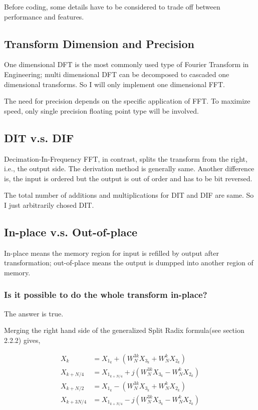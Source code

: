 \documentclass[a4paper]{report}
\begin{document}
	Before coding, some details have to be considered to trade off between performance and features.

\subsection{Transform Dimension and Precision} \indent

	One dimensional DFT is the most commonly used type of Fourier Transform in Engineering; multi dimensional DFT can be decomposed to cascaded one dimensional transforms. So I will only implement one dimensional FFT.
	
	The need for precision depends on the specific application of FFT. To maximize speed, only single precision floating point type will be involved.

\subsection{DIT v.s. DIF} \indent

	Decimation-In-Frequency FFT, in contrast, splits the transform from the right, i.e., the output side. The derivation method is generally same. Another difference is, the input is ordered but the output is out of order and has to be bit reversed.
	
	The total number of additions and multiplications for DIT and DIF are same. So I just arbitrarily chosed DIT.

\subsection{In-place v.s. Out-of-place} \indent

	In-place means the memory region for input is refilled by output after transformation; out-of-place means the output is dumpped into another region of memory.
	
\subsubsection{Is it possible to do the whole transform in-place?} \indent

	The answer is true.
	
	\bigskip
	
	Merging the right hand side of the generalized Split Radix formula(see section 2.2.2) gives,
	
	\[\begin{split}
  X_k 		  & = X_{1_k} + \left(W_N^{3k} X_{3_k} + W_N^k X_{2_k}\right)\\
  X_{k + N/4}  & = X_{1_{k + N/4}} + j\left(W_N^{3k} X_{3_k} - W_N^k X_{2_k}\right) \\
  X_{k + N/2}  & = X_{1_k} - \left(W_N^{3k} X_{3_k} + W_N^k X_{2_k}\right) \\
  X_{k + 3N/4} & = X_{1_{k + N/4}} - j\left(W_N^{3k} X_{3_k} - W_N^k X_{2_k}\right) \\
	\end{split}\]
	
\end{document}
